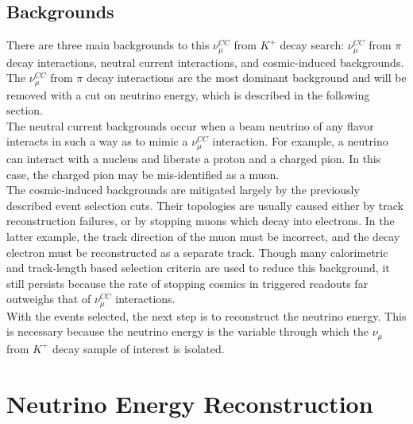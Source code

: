 \subsection{Backgrounds}
There are three main backgrounds to this $\nu_\mu^{CC}$ from $K^+$ decay search: $\nu_\mu^{CC}$ from $\pi$ decay interactions, neutral current interactions, and cosmic-induced backgrounds. The $\nu_\mu^{CC}$ from $\pi$ decay interactions are the most dominant background and will be removed with a cut on neutrino energy, which is described in the following section.\\

The neutral current backgrounds occur when a beam neutrino of any flavor interacts in such a way as to mimic a $\nu_\mu^{CC}$ interaction. For example, a neutrino can interact with a nucleus and liberate a proton and a charged pion. In this case, the charged pion may be mis-identified as a muon.\\ %

The cosmic-induced backgrounds are mitigated largely by the previously described event selection cuts. Their topologies are usually caused either by track reconstruction failures, or by stopping muons which decay into electrons. In the latter example, the track direction of the muon must be incorrect, and the decay electron must be reconstructed as a separate track. Though many calorimetric and track-length based selection criteria are used to reduce this background, it still persists because the rate of stopping cosmics in triggered readouts far outweighs that of $\nu_\mu^{CC}$ interactions.\\

With the events selected, the next step is to reconstruct the neutrino energy. This is necessary because the neutrino energy is the variable through which the $\nu_\mu$ from $K^+$ decay sample of interest is isolated.

\section{Neutrino Energy Reconstruction}\label{kaon_nu_energy_section}

